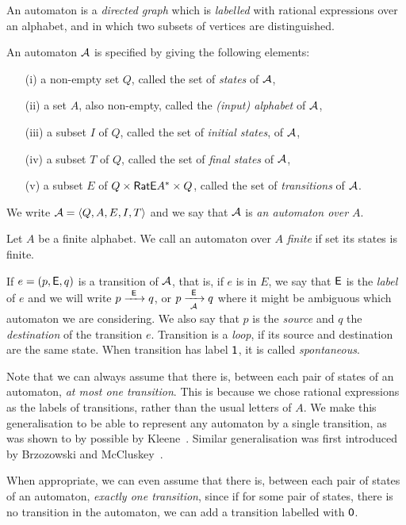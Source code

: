 An automaton is a \emph{directed graph} which is \emph{labelled} with rational expressions over an alphabet, and in which two subsets of vertices are distinguished.

\begin{defn}
    An automaton ${\mathcal{A}}$ is specified by giving the following elements:
    \begin{itemize}
        \item[(i)] a non-empty set $Q$, called the set of \emph{states} of ${\mathcal{A}}$,
        \item[(ii)] a set $A$, also non-empty, called the \emph{(input) alphabet} of ${\mathcal{A}}$,
        \item[(iii)] a subset $I$ of $Q$, called the set of \emph{initial states}, of ${\mathcal{A}}$,
        \item[(iv)] a subset $T$ of $Q$, called the set of \emph{final states} of ${\mathcal{A}}$,
        \item[(v)] a subset $E$ of $Q \times {\mathsf{RatE}} A^* \times Q$, called the set of \emph{transitions} of ${\mathcal{A}}$.
    \end{itemize}
    We write ${\mathcal{A}} = \langle Q, A, E, I, T \rangle$ and we say that ${\mathcal{A}}$ is \emph{an automaton over $A$}.
\end{defn}

Let $A$ be a finite alphabet. We call an automaton over $A$ \emph{finite} if set its states is finite.

If $e = (p, {\mathsf{E}}, q)$ is a transition of ${\mathcal{A}}$, that is, if $e$ is in $E$, we say that ${\mathsf{E}}$ is the \emph{label} of $e$ and we will write $p {\; \xrightarrow[]{\: \; {\mathsf{E}} \: \;} \;} q$, or $p {\; \xrightarrow[{\mathcal{A}}]{\: \; {\mathsf{E}} \: \;} \;} q$ where it might be ambiguous which automaton we are considering. We also say that $p$ is the \emph{source} and $q$ the \emph{destination} of the transition $e$. Transition is a \emph{loop}, if its source and destination are the same state. When transition has label ${\mathsf{1}}$, it is called \emph{spontaneous}.

Note that we can always assume that there is, between each pair of states of an automaton, \emph{at most one transition}. This is because we chose rational expressions as the labels of transitions, rather than the usual letters of $A$. We make this generalisation to be able to represent any automaton by a single transition, as was shown to by possible by Kleene~\cite{Kleene56}. Similar generalisation was first introduced by Brzozowski and McCluskey~\cite{BrzozowskiMcCluskey64}.

When appropriate, we can even assume that there is, between each pair of states of an automaton, \emph{exactly one transition}, since if for some pair of states, there is no transition in the automaton, we can add a transition labelled with ${\mathsf{0}}$.

